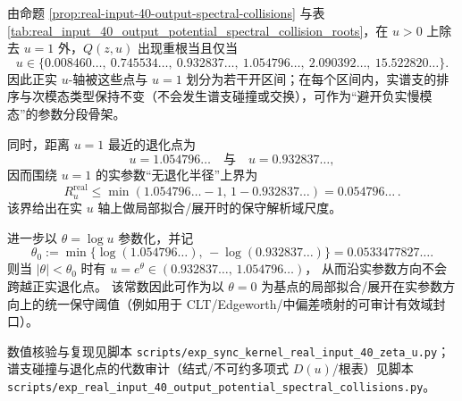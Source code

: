 \begin{remark}[正实退化点的相图区间与实参数半径]\label{rem:real-input-40-output-potential-degeneracy-phase}
由命题 \ref{prop:real-input-40-output-spectral-collisions} 与表 \ref{tab:real_input_40_output_potential_spectral_collision_roots}，在 \(u>0\) 上除去 \(u=1\) 外，\(Q(z,u)\) 出现重根当且仅当
\[
u\in\{0.008460\ldots,\ 0.745534\ldots,\ 0.932837\ldots,\ 1.054796\ldots,\ 2.090392\ldots,\ 15.522820\ldots\}.
\]
因此正实 \(u\)-轴被这些点与 \(u=1\) 划分为若干开区间；在每个区间内，实谱支的排序与次模态类型保持不变（不会发生谱支碰撞或交换），可作为“避开负实慢模态”的参数分段骨架。
\par
同时，距离 \(u=1\) 最近的退化点为
\[
u=1.054796\ldots\quad\text{与}\quad u=0.932837\ldots,
\]
因而围绕 \(u=1\) 的实参数“无退化半径”上界为
\[
R_u^{\mathrm{real}}\le \min(1.054796\ldots-1,\,1-0.932837\ldots)=0.054796\ldots\,.
\]
该界给出在实 \(u\) 轴上做局部拟合/展开时的保守解析域尺度。
\par
进一步以 \(\theta=\log u\) 参数化，并记
\[
\theta_0:=\min\{\log(1.054796\ldots),\,-\log(0.932837\ldots)\}
=0.0533477827\ldots.
\]
则当 \(|\theta|<\theta_0\) 时有 \(u=e^\theta\in(0.932837\ldots,\,1.054796\ldots)\)，
从而沿实参数方向不会跨越正实退化点。
该常数因此可作为以 \(\theta=0\) 为基点的局部拟合/展开在实参数方向上的统一保守阈值（例如用于 CLT/Edgeworth/中偏差喷射的可审计有效域封口）。
\end{remark}

数值核验与复现见脚本 \texttt{scripts/exp\_sync\_kernel\_real\_input\_40\_zeta\_u.py}；谱支碰撞与退化点的代数审计（结式/不可约多项式 $D(u)$/根表）见脚本 \texttt{scripts/exp\_real\_input\_40\_output\_potential\_spectral\_collisions.py}。
